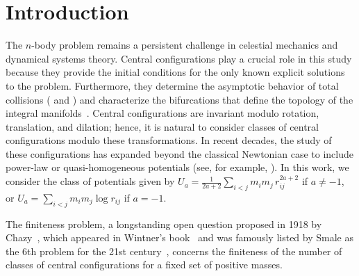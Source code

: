 \documentclass{amsart}
\theoremstyle{definition}
\theoremstyle{remark}
\numberwithin{equation}{section}
\begin{document}

\maketitle


\section{Introduction}








The $n$-body problem remains a persistent challenge in celestial mechanics and dynamical systems theory. Central configurations play a crucial role in this study because they provide the initial conditions for the only known explicit solutions to the problem. Furthermore, they determine the asymptotic behavior of total collisions (\cite{sundman1909probleme} and \cite[\S 333-339 and \S361-364]{wintner2014analytical}) and characterize the bifurcations that define the topology of the integral manifolds~\cite{albouy1993integral, cabral1973integral, mccord1998integral, smale1970topology}. Central configurations are invariant modulo rotation, translation, and dilation; hence, it is natural to consider classes of central configurations modulo these transformations. In recent decades, the study of these configurations has expanded beyond the classical Newtonian case to include power-law or quasi-homogeneous potentials (see, for example, \cite{diacu2006central, tang2024perturbing, wang2023centered, liu2023stacked, santos2019inverse}). In this work, we consider the class of potentials given by $U_a=\frac{1}{2a + 2} \sum_{i < j} m_i m_j \, r_{ij}^{2a + 2}$ if $a \ne -1$, or $U_a=\sum_{i < j} m_i m_j \log r_{ij}$ if $a = -1$.

The finiteness problem,  a longstanding open question proposed in 1918 by Chazy~\cite{chazy1918certaines}, which appeared in Wintner's book~\cite{wintner2014analytical} and was famously listed by Smale as the 6th problem for the 21st century~\cite{smale1998mathematical}, concerns the finiteness of the number of classes of central configurations for a fixed set of positive masses.
\end{document}
